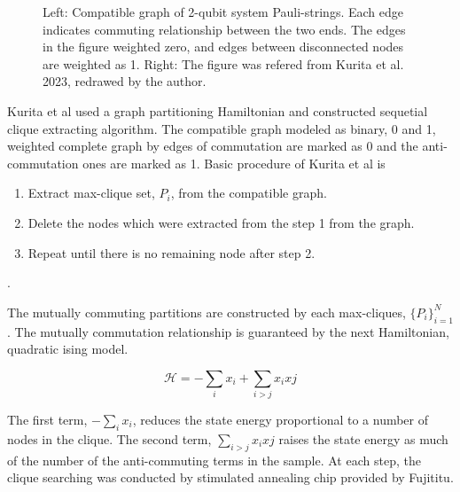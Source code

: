 \begin{figure}[ht]
    \centering
    \scalebox{0.7}{
        
        
        }
    \caption{
        Left: Compatible graph of 2-qubit system Pauli-strings. 
        Each edge indicates commuting relationship between the two ends.
        The edges in the figure weighted zero, and edges between disconnected nodes
        are weighted as 1.
        Right:
        The figure was refered from Kurita et al. 2023, redrawed by the author\cite{kurital_2023}.
    }
    \label{fig:compatible_graph_example_2qubits}
\end{figure}
%        

Kurita et al used a graph partitioning Hamiltonian and 
constructed sequetial clique extracting algorithm.
The compatible graph modeled as binary, 0 and 1, weighted 
complete graph by edges of commutation are marked as 0 
and the anti-commutation ones are marked as 1.
Basic procedure of Kurita et al is 

\begin{enumerate}
    \item Extract max-clique set, $P_i$, from the compatible graph.
    \item Delete the nodes which were extracted from the step 1 from the graph.
    \item Repeat until there is no remaining node after step 2.
\end{enumerate}.

The mutually commuting partitions are constructed 
by each max-cliques, $\{P_i\}_{i=1}^N$. 
The mutually commutation relationship is guaranteed by the next 
Hamiltonian, quadratic ising model.

\begin{equation}
    \mathcal{H} = -\sum_i x_i + \sum_{i >j} x_i xj
\end{equation}

The first term, $-\sum_i x_i$, reduces the state energy 
proportional to a number of nodes in the clique.
The second term, $\sum_{i >j} x_i xj$ raises the state energy
as much of the number of the anti-commuting terms in the sample.
At each step, the clique searching was conducted by stimulated annealing chip provided by Fujititu. 


